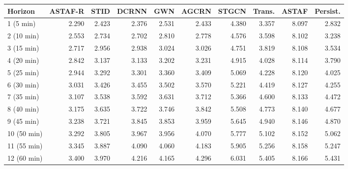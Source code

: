 \begin{tabular}{lrrrrrrrrr}
\toprule
Horizon & ASTAF-R & STID & DCRNN & GWN & AGCRN & STGCN & Trans. & ASTAF & Persist.\\
\midrule
1 (5 min) & 2.290 & 2.423 & 2.376 & 2.531 & 2.433 & 4.380 & 3.357 & 8.097 & 2.832\\
2 (10 min) & 2.553 & 2.734 & 2.702 & 2.810 & 2.778 & 4.576 & 3.598 & 8.102 & 3.238\\
3 (15 min) & 2.717 & 2.956 & 2.938 & 3.024 & 3.026 & 4.751 & 3.819 & 8.108 & 3.534\\
4 (20 min) & 2.842 & 3.137 & 3.133 & 3.202 & 3.231 & 4.915 & 4.028 & 8.114 & 3.790\\
5 (25 min) & 2.944 & 3.292 & 3.301 & 3.360 & 3.409 & 5.069 & 4.228 & 8.120 & 4.025\\
6 (30 min) & 3.031 & 3.426 & 3.455 & 3.502 & 3.570 & 5.221 & 4.419 & 8.127 & 4.255\\
7 (35 min) & 3.107 & 3.538 & 3.592 & 3.631 & 3.712 & 5.366 & 4.600 & 8.133 & 4.472\\
8 (40 min) & 3.175 & 3.635 & 3.722 & 3.746 & 3.842 & 5.508 & 4.773 & 8.140 & 4.677\\
9 (45 min) & 3.238 & 3.721 & 3.845 & 3.853 & 3.959 & 5.645 & 4.940 & 8.146 & 4.870\\
10 (50 min) & 3.292 & 3.805 & 3.967 & 3.956 & 4.070 & 5.777 & 5.102 & 8.152 & 5.062\\
11 (55 min) & 3.345 & 3.887 & 4.090 & 4.060 & 4.183 & 5.905 & 5.256 & 8.158 & 5.247\\
12 (60 min) & 3.400 & 3.970 & 4.216 & 4.165 & 4.296 & 6.031 & 5.405 & 8.166 & 5.431\\
\bottomrule
\end{tabular}
